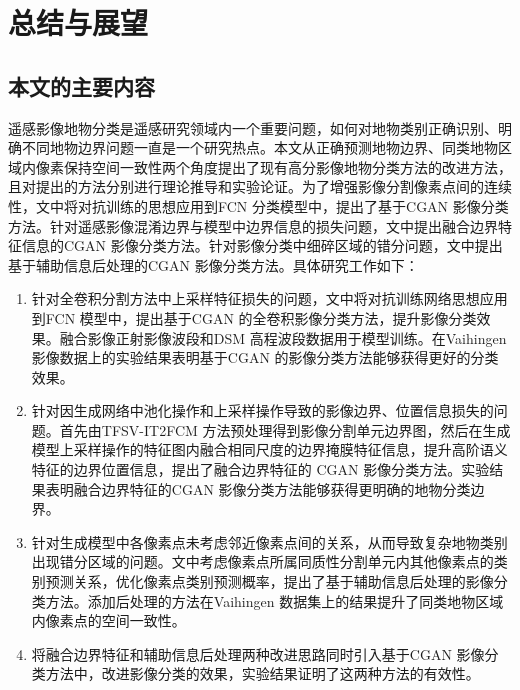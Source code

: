 
\chapter{总结与展望}
\label{cha:chap05}

\section{本文的主要内容}
\label{sec:5-1}
遥感影像地物分类是遥感研究领域内一个重要问题，如何对地物类别正确识别、明确不同地物边界问题一直是一个研究热点。本文从正确预测地物边界、同类地物区域内像素保持空间一致性两个角度提出了现有高分影像地物分类方法的改进方法，且对提出的方法分别进行理论推导和实验论证。为了增强影像分割像素点间的连续性，文中将对抗训练的思想应用到FCN 分类模型中，提出了基于CGAN 影像分类方法。针对遥感影像混淆边界与模型中边界信息的损失问题，文中提出融合边界特征信息的CGAN 影像分类方法。针对影像分类中细碎区域的错分问题，文中提出基于辅助信息后处理的CGAN 影像分类方法。具体研究工作如下：
\begin{enumerate}[(1)]
  \item 针对全卷积分割方法中上采样特征损失的问题，文中将对抗训练网络思想应用到FCN 模型中，提出基于CGAN 的全卷积影像分类方法，提升影像分类效果。融合影像正射影像波段和DSM 高程波段数据用于模型训练。在Vaihingen 影像数据上的实验结果表明基于CGAN 的影像分类方法能够获得更好的分类效果。
  \item 针对因生成网络中池化操作和上采样操作导致的影像边界、位置信息损失的问题。首先由TFSV-IT2FCM 方法预处理得到影像分割单元边界图，然后在生成模型上采样操作的特征图内融合相同尺度的边界掩膜特征信息，提升高阶语义特征的边界位置信息，提出了融合边界特征的 CGAN 影像分类方法。实验结果表明融合边界特征的CGAN 影像分类方法能够获得更明确的地物分类边界。
  \item 针对生成模型中各像素点未考虑邻近像素点间的关系，从而导致复杂地物类别出现错分区域的问题。文中考虑像素点所属同质性分割单元内其他像素点的类别预测关系，优化像素点类别预测概率，提出了基于辅助信息后处理的影像分类方法。添加后处理的方法在Vaihingen 数据集上的结果提升了同类地物区域内像素点的空间一致性。
  \item 将融合边界特征和辅助信息后处理两种改进思路同时引入基于CGAN 影像分类方法中，改进影像分类的效果，实验结果证明了这两种方法的有效性。
\end{enumerate}


